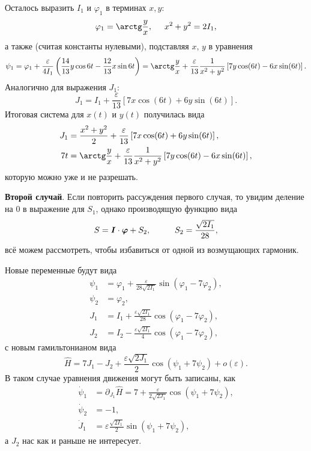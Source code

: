 Осталось выразить $I_1$ и $\varphi_1$ в терминах $x, y$:
\begin{equation*}
    \varphi_1 = \arctg \frac{y}{x}, \hspace{5 mm} x^2 + y^2 = 2 I_1,
\end{equation*}
а также (считая константы нулевыми), подставляя $x,\, y$ в уравнения
\begin{equation*}
    \psi_1 = \varphi_1 + \frac{\varepsilon}{4 I_1}\left(
        \frac{14}{13} y \cos 6 t - \frac{12}{13} x \sin 6 t
    \right) = 
    \arctg \frac{y}{x} + \frac{\varepsilon}{13} \frac{1}{x^2+y^2} \left[
        7 y \cos(6t) - 6 x \sin(6t)
    \right].
\end{equation*}
Аналогично для выражения $J_1$:
\begin{equation*}
    J_1 = I_1 + \frac{\varepsilon}{13}\left[
        7 x \cos (6 t) + 6 y \sin (6t)
    \right].
\end{equation*}
Итоговая система для $x(t)$ и $y(t)$ получилась вида
\begin{align*}
    J_1 &= \frac{x^2+y^2}{2} + \frac{\varepsilon}{13}\left[
        7 x \cos (6 t) + 6 y \sin (6t)
    \right], \\
    7 t &= \arctg \frac{y}{x} + \frac{\varepsilon}{13} \frac{1}{x^2+y^2} \left[
        7 y \cos(6t) - 6 x \sin(6t)
    \right],
\end{align*}
которую можно уже и не разрешать.


\textbf{Второй случай}. Если повторить рассуждения первого случая, то увидим деление на $0$ в выражение для $S_1$, однако производящую функцию вида
\begin{equation*}
    S = \vc{I} \cdot \vc{\varphi} + S_2,
    \hspace{10 mm} 
    S_2 = \frac{\sqrt{2I_1}}{28},
\end{equation*}
всё можем рассмотреть, чтобы избавиться от одной из возмущающих гармоник.

Новые переменные будут вида
\begin{align*}
    \psi_1 &= \varphi_1 + \frac{\varepsilon}{28 \sqrt{2I_1}} \sin(\varphi_1 - 7 \varphi_2), \\
    \psi_2 &= \varphi_2, \\
    J_1 &= I_1 + \frac{\varepsilon \sqrt{2I_1}}{28} \cos\left(\varphi_1 - 7 \varphi_2\right), \\
    J_2 &= I_2 - \frac{\varepsilon \sqrt{2 I_1}}{4} \cos\left(\varphi_1 - 7 \varphi_2\right),
\end{align*}
с новым гамильтонианом вида
\begin{equation*}
    \hat{H} = 7 J_1 - J_2 + \frac{\varepsilon \sqrt{2 J_1}}{2} \cos(\psi_1 + 7 \psi_2) + o(\varepsilon).
\end{equation*}
В таком случае уравнения движения могут быть записаны, как
\begin{align*}
    \dot{\psi}_1 &= \partial_{J_1} \hat{H} = 7 + \frac{\varepsilon}{2 \sqrt{2 J_1}} \cos (\psi_1 + 7 \psi_2), \\
    \dot{\psi}_2 &= -1, \\
    \dot{J}_1 &= \varepsilon \frac{\sqrt{2 I_1}}{2} \sin(\psi_1 + 7 \psi_2),
\end{align*}
а $J_2$ нас как и раньше не интересует. 

